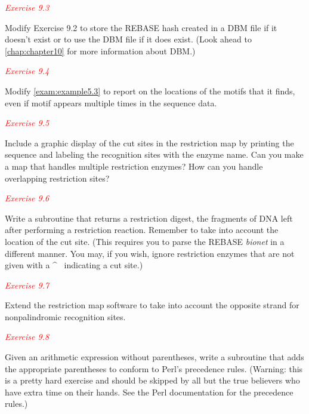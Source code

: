 \textcolor{red}{\textit{Exercise 9.3}}
\begin{adjustwidth}{2em}{}
Modify Exercise 9.2 to store the REBASE hash created in a DBM file if it doesn't exist or to use the DBM file if it does exist. (Look ahead to \autoref{chap:chapter10} for more information about DBM.) 
\end{adjustwidth}

\textcolor{red}{\textit{Exercise 9.4}}
\begin{adjustwidth}{2em}{}
Modify \autoref{exam:example5.3} to report on the locations of the motifs that it finds, even if motif appears multiple times in the sequence data. 
\end{adjustwidth}

\textcolor{red}{\textit{Exercise 9.5}}
\begin{adjustwidth}{2em}{}
Include a graphic display of the cut sites in the restriction map by printing the sequence and labeling the recognition sites with the enzyme name. Can you make a map that handles multiple restriction enzymes? How can you handle overlapping restriction sites? 
\end{adjustwidth}

\textcolor{red}{\textit{Exercise 9.6}}
\begin{adjustwidth}{2em}{}
Write a subroutine that returns a restriction digest, the fragments of DNA left after performing a restriction reaction. Remember to take into account the location of the cut site. (This requires you to parse the REBASE \textit{bionet} in a different manner. You may, if you wish, ignore restriction enzymes that are not given with a \^~ indicating a cut site.) 
\end{adjustwidth}


\textcolor{red}{\textit{Exercise 9.7}}
\begin{adjustwidth}{2em}{}
Extend the restriction map software to take into account the opposite strand for nonpalindromic recognition sites. 
\end{adjustwidth}

\textcolor{red}{\textit{Exercise 9.8}}
\begin{adjustwidth}{2em}{}
Given an arithmetic expression without parentheses, write a subroutine that adds the appropriate parentheses to conform to Perl's precedence rules. (Warning: this is a pretty hard exercise and should be skipped by all but the true believers who have extra time on their hands. See the Perl documentation for the precedence rules.) 
\end{adjustwidth}

